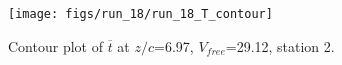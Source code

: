\begin{figure}[H]
\centering
\texttt{[image: figs/run\_18/run\_18\_T\_contour]}
\caption{Contour plot of $\overline{t}$ at $z/c$=6.97, $V_{free}$=29.12, station 2.}
\label{fig:run_18_T_contour}
\end{figure}


